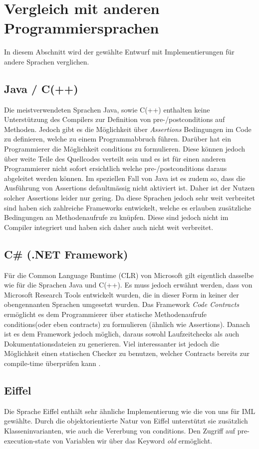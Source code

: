 \section{Vergleich mit anderen Programmiersprachen}
In diesem Abschnitt wird der gewählte Entwurf mit Implementierungen
für andere Sprachen verglichen.

\subsection{Java / C(++)}
Die meistverwendeten Sprachen Java, sowie C(++) enthalten keine Unterstützung des Compilers 
zur Definition von pre-/postconditions auf Methoden. Jedoch gibt es die Möglichkeit 
über \textit{Assertions} Bedingungen im Code zu definieren, welche zu einem Programmabbruch führen.
Darüber hat ein Programmierer die Möglichkeit conditions zu formulieren. Diese können jedoch über weite
Teile des Quellcodes verteilt sein und es ist für einen anderen Programmierer nicht 
sofort ersichtlich welche pre-/postconditions daraus abgeleitet werden können. Im speziellen 
Fall von Java ist es zudem so, dass die Ausführung von Assertions defaultmässig nicht aktiviert 
ist. Daher ist der Nutzen solcher Assertions leider nur gering. Da diese Sprachen jedoch 
sehr weit verbreitet sind haben sich zahlreiche Frameworks entwickelt, welche es erlauben
zusätzliche Bedingungen an Methodenaufrufe zu knüpfen. Diese sind jedoch nicht im Compiler integriert
und haben sich daher auch nicht weit verbreitet.

\subsection{C\# (.NET Framework)}

Für die Common Language Runtime (CLR) von Microsoft gilt eigentlich dasselbe wie für die Sprachen 
Java und C(++). Es muss jedoch erwähnt werden, dass von Microsoft Research Tools entwickelt wurden, 
die in dieser Form in keiner der obengennanten Sprachen umgesetzt wurden. Das Framework 
\textit{Code Contracts} ermöglicht es dem Programmierer über statische Methodenaufrufe 
conditions(oder eben contracts) zu formulieren (ähnlich wie Assertions). 
Danach ist es dem Framework jedoch möglich, daraus sowohl Laufzeitchecks als auch 
Dokumentationsdateien zu generieren. Viel interessanter ist jedoch die Möglichkeit einen 
statischen Checker zu benutzen, welcher Contracts bereits zur compile-time überprüfen 
kann \cite{MS:StaticAnalysis}.

\subsection{Eiffel}
Die Sprache Eiffel enthält sehr ähnliche Implementierung wie die von uns für IML gewählte. Durch
die objektorientierte Natur von Eiffel unterstützt sie zusätzlich Klasseninvarianten, wie auch die
Vererbung von conditions. Den Zugriff auf pre-execution-state von Variablen wir über das 
Keyword \textit{old} ermöglicht.

